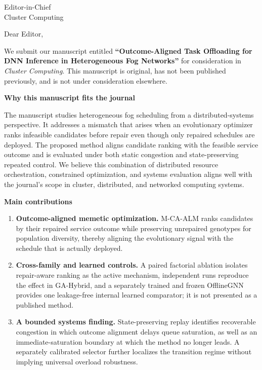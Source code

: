 \documentclass[11pt]{letter}
\begin{document}
\begin{letter}{
    Editor-in-Chief \\
    Cluster Computing
}

\opening{Dear Editor,}

We submit our manuscript entitled \textbf{``Outcome-Aligned Task Offloading for DNN Inference in Heterogeneous Fog Networks''} for consideration in \textit{Cluster Computing}. This manuscript is original, has not been published previously, and is not under consideration elsewhere.

\textbf{Why this manuscript fits the journal}

\medskip

The manuscript studies heterogeneous fog scheduling from a distributed-systems perspective. It addresses a mismatch that arises when an evolutionary optimizer ranks infeasible candidates before repair even though only repaired schedules are deployed. The proposed method aligns candidate ranking with the feasible service outcome and is evaluated under both static congestion and state-preserving repeated control. We believe this combination of distributed resource orchestration, constrained optimization, and systems evaluation aligns well with the journal's scope in cluster, distributed, and networked computing systems.

\medskip
\textbf{Main contributions}

\medskip

\begin{enumerate}
    \item \textbf{Outcome-aligned memetic optimization.} M-CA-ALM ranks candidates by their repaired service outcome while preserving unrepaired genotypes for population diversity, thereby aligning the evolutionary signal with the schedule that is actually deployed.

    \item \textbf{Cross-family and learned controls.} A paired factorial ablation isolates repair-aware ranking as the active mechanism, independent runs reproduce the effect in GA-Hybrid, and a separately trained and frozen OfflineGNN provides one leakage-free internal learned comparator; it is not presented as a published method.

    \item \textbf{A bounded systems finding.} State-preserving replay identifies recoverable congestion in which outcome alignment delays queue saturation, as well as an immediate-saturation boundary at which the method no longer leads. A separately calibrated selector further localizes the transition regime without implying universal overload robustness.
\end{enumerate}


\end{letter}
\end{document}
